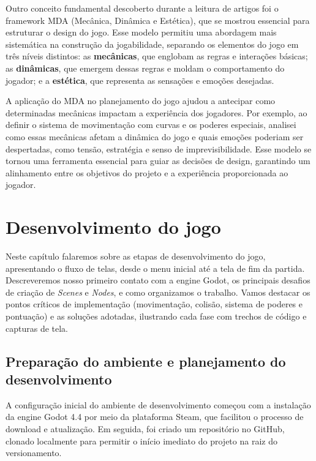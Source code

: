 Outro conceito fundamental descoberto durante a leitura de artigos foi o framework MDA (Mecânica, Dinâmica e Estética), que se mostrou essencial para estruturar o design do jogo. Esse modelo permitiu uma abordagem mais sistemática na construção da jogabilidade, separando os elementos do jogo em três níveis distintos: as \textbf{mecânicas}, que englobam as regras e interações básicas; as \textbf{dinâmicas}, que emergem dessas regras e moldam o comportamento do jogador; e a \textbf{estética}, que representa as sensações e emoções desejadas.

A aplicação do MDA no planejamento do jogo ajudou a antecipar como determinadas mecânicas impactam a experiência dos jogadores. Por exemplo, ao definir o sistema de movimentação com curvas e os poderes especiais, analisei como essas mecânicas afetam a dinâmica do jogo e quais emoções poderiam ser despertadas, como tensão, estratégia e senso de imprevisibilidade. Esse modelo se tornou uma ferramenta essencial para guiar as decisões de design, garantindo um alinhamento entre os objetivos do projeto e a experiência proporcionada ao jogador.

\section{Desenvolvimento do jogo}

Neste capítulo falaremos sobre as etapas de desenvolvimento do jogo, apresentando o fluxo de telas, desde o menu inicial até a tela de fim da partida. Descreveremos nosso primeiro contato com a engine Godot, os principais desafios de criação de \textit{Scenes} e \textit{Nodes}, e como organizamos o trabalho. Vamos destacar os pontos críticos de implementação (movimentação, colisão, sistema de poderes e pontuação) e as soluções adotadas, ilustrando cada fase com trechos de código e capturas de tela.

\subsection{Preparação do ambiente e planejamento do desenvolvimento}

A configuração inicial do ambiente de desenvolvimento começou com a instalação da engine Godot 4.4 por meio da plataforma Steam, que facilitou o processo de download e atualização. Em seguida, foi criado um repositório no GitHub, clonado localmente para permitir o início imediato do projeto na raiz do versionamento.

